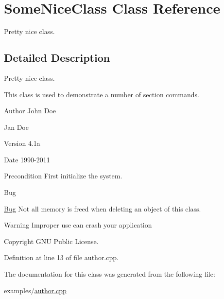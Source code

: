 \hypertarget{class_some_nice_class}{}\section{Some\+Nice\+Class Class Reference}
\label{class_some_nice_class}


Pretty nice class.  




\subsection{Detailed Description}
Pretty nice class. 

This class is used to demonstrate a number of section commands. \begin{DoxyAuthor}{Author}
John Doe 

Jan Doe 
\end{DoxyAuthor}
\begin{DoxyVersion}{Version}
4.\+1a 
\end{DoxyVersion}
\begin{DoxyDate}{Date}
1990-\/2011 
\end{DoxyDate}
\begin{DoxyPrecond}{Precondition}
First initialize the system. 
\end{DoxyPrecond}
\begin{DoxyRefDesc}{Bug}
\item[\hyperlink{bug__bug000001}{Bug}]Not all memory is freed when deleting an object of this class. \end{DoxyRefDesc}
\begin{DoxyWarning}{Warning}
Improper use can crash your application 
\end{DoxyWarning}
\begin{DoxyCopyright}{Copyright}
G\+NU Public License. 
\end{DoxyCopyright}


Definition at line 13 of file author.\+cpp.



The documentation for this class was generated from the following file\+:\begin{DoxyCompactItemize}
\item 
examples/\hyperlink{author_8cpp}{author.\+cpp}\end{DoxyCompactItemize}
